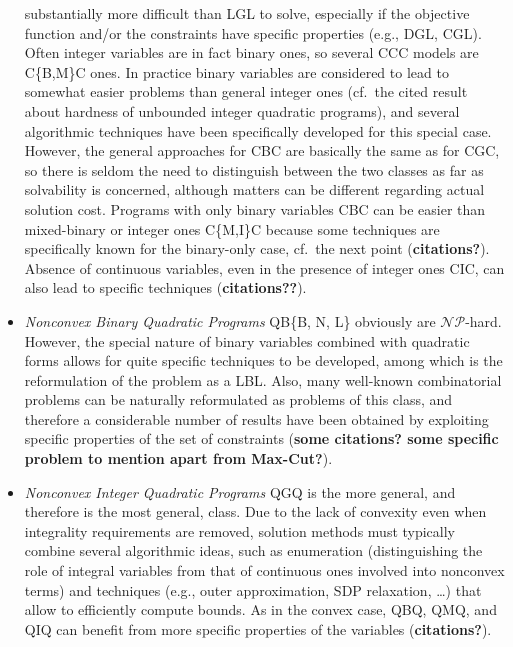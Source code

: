 \begin{itemize}
 substantially more difficult than LGL to solve, especially if the objective function and/or the constraints have specific properties (e.g., DGL, CGL). Often integer variables are in fact binary ones, so several CCC models are C\{B,M\}C ones. In practice binary variables are considered to lead to somewhat easier problems than general integer ones (cf.~the cited result about hardness of unbounded integer quadratic programs), and several algorithmic techniques have been specifically developed for this special case. However, the general approaches for CBC are basically the same as for CGC, so there is seldom the need to distinguish between the two classes as far as solvability is concerned, although matters can be different regarding actual solution cost. Programs with only binary variables CBC can be easier than mixed-binary or integer ones C\{M,I\}C because some techniques are specifically known for the binary-only case, cf.~the next point ({\bf citations?}). Absence of continuous variables, even in the presence of integer ones CIC, can also lead to specific techniques ({\bf citations??}).  
  \item \emph{Nonconvex Binary Quadratic Programs} QB\{B, N, L\} obviously are $\mathcal{NP}$-hard. However, the special nature of binary variables combined with quadratic forms allows for quite specific techniques to be developed, among which is the reformulation of the problem as a LBL. Also, many well-known combinatorial problems can be naturally reformulated as problems of this class, and therefore a considerable number of results have been obtained by exploiting specific properties of the set of constraints ({\bf some citations? some specific problem to mention apart from Max-Cut?}).
  \item \emph{Nonconvex Integer Quadratic Programs} QGQ is the more general, and therefore is the most general, class. Due to the lack of convexity even when integrality requirements are removed, solution methods must typically combine several algorithmic ideas, such as enumeration (distinguishing the role of integral variables from that of continuous ones involved into nonconvex terms) and techniques (e.g., outer approximation, SDP relaxation, \ldots) that allow to efficiently compute bounds. As in the convex case, QBQ, QMQ, and QIQ can benefit from more specific properties of the variables ({\bf citations?}).
\end{itemize}
%
